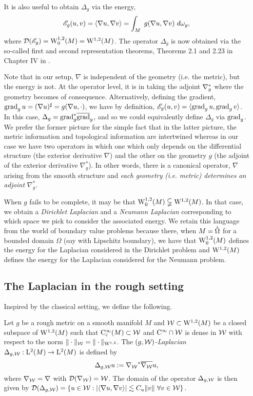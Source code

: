 \documentclass[a4paper, 12pt]{amsart}
\begin{document}
It is also useful to obtain $\Delta_g$ via the energy,
$$\sE_g(u,v) = \inprod{\nabla u, \nabla v} = \int_M\ g(\nabla u, \nabla v)\ d\omega_g,$$
where $\dom(\sE_g) = \SobH[0]{1}(M) = \SobH{1}(M)$.
The operator $\Delta_g$ is now obtained via the so-called first and second representation 
theorems, Theorems 2.1 and 2.23 in Chapter IV  in \cite{Kato}.
 
Note that in our setup, $\nabla$ is independent of the geometry (i.e. the metric), but the energy is not. At the operator level, it is in taking the adjoint $\adj{\nabla}_g$ where the geometry becomes of consequence. Alternatively, defining the gradient, $\grad_g u =  (\nabla u)^\sharp = g(\nabla u, \cdot)$, we have by definition, $\sE_g(u,v) = \inprod{\grad_g u, \grad_g v}$. In this case, $\Delta_g = \adj{\grad}_g \close{\grad}_g$, and so we could equivalently define \(\Delta_g\) via \(\grad_g\). We prefer the former picture for the simple fact that in the latter picture, the metric information and topological information are intertwined whereas in our case we have two operators in which one which only depends on the differential structure (the exterior derivative $\nabla$) and the other on the geometry $g$ (the adjoint of the exterior derivative $\nabla^\ast_g$). In other words, there is a canonical
operator, $\nabla$ arising from the smooth structure and \emph{each geometry (i.e. metric) determines an adjoint $\nabla^{\ast}_g$}.


When $g$ fails to be complete, it may be that  
$\SobH[0]{1}(M) \subsetneqq  \SobH{1}(M)$.
In that case, we obtain a \emph{Dirichlet Laplacian} and  a \emph{Neumann 
Laplacian} corresponding to which space we pick 
to consider the associated energy.
We retain this language from the world of boundary 
value problems because there, when $M = \interior\Omega$
for a bounded domain $\Omega$ (say with Lipschitz boundary), we have that
$\SobH[0]{1}(M)$ defines the energy for
the Laplacian considered in the Dirichlet problem
and $\SobH{1}(M)$ defines the energy 
for the Laplacian considered for the Neumann problem.

\subsection{The Laplacian in the rough setting}
Inspired by the classical setting, we define
the following.
 
\begin{defn}[$(g,\cW)$-Laplacian]
Let \(g\) be a rough metric on a smooth manifold \(M\)
and $\cW \subset \SobH{1}(M)$ be a closed subspace
of $\SobH{1}(M)$ such that $\Ck[c]{\infty}(M) \subset \cW$
and $\Ck{\infty} \cap \cW$ is dense in $\cW$ with respect to the norm $\norm{\cdot}_{\cW} = \norm{\cdot}_{\SobH{1}}$. The \emph{$(g,\cW)$-Laplacian}
\(\Delta_{g,\cW} : \Lp{2}(M) \to \Lp{2}(M)\) is defined by
\[
\Delta_{g,\cW} u := \adj{\nabla_{\cW}} \close{ \nabla_{\cW}} u,
\]
where  $\nabla_{\cW} = \nabla$ with $\dom(\nabla_{\cW}) = \cW$. 
The domain of the operator $\Delta_{g,\cW}$ is then given by
$\dom(\Delta_{g,\cW}) = \set{u \in \cW: \modulus{\inprod{\nabla u, \nabla v}} \lesssim C_u \norm{v}\ \forall v \in \cW}.$
\end{defn}
\end{document}
